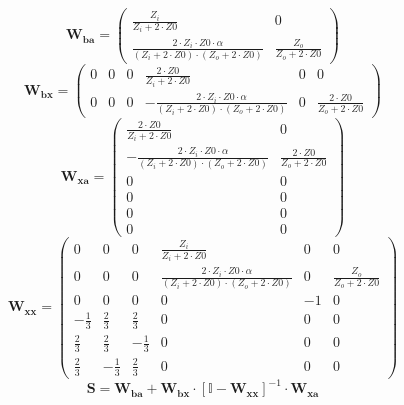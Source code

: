 \[ \mathbf{W_{ba}} = \left(\begin{smallmatrix} \frac{Z_i}{Z_i+2\cdot
Z0} & 0 \\ \frac{2\cdot Z_i\cdot Z0\cdot \alpha}{\left(Z_i+2\cdot
Z0\right)\cdot\left(Z_o+2\cdot Z0\right)} & \frac{Z_o}{Z_o+2\cdot Z0}
\end{smallmatrix}\right) \]
\[ \mathbf{W_{bx}} = \left(\begin{smallmatrix} 0 & 0 & 0 &
\frac{2\cdot Z0}{Z_i+2\cdot Z0} & 0 & 0 \\ 0 & 0 & 0 & -\frac{2\cdot
Z_i\cdot Z0\cdot \alpha}{\left(Z_i+2\cdot
Z0\right)\cdot\left(Z_o+2\cdot Z0\right)} & 0 & \frac{2\cdot
Z0}{Z_o+2\cdot Z0} \end{smallmatrix}\right) \]
\[ \mathbf{W_{xa}} = \left(\begin{smallmatrix} \frac{2\cdot
Z0}{Z_i+2\cdot Z0} & 0 \\ -\frac{2\cdot Z_i\cdot Z0\cdot
\alpha}{\left(Z_i+2\cdot Z0\right)\cdot\left(Z_o+2\cdot Z0\right)} &
\frac{2\cdot Z0}{Z_o+2\cdot Z0} \\ 0 & 0 \\ 0 & 0 \\ 0 & 0 \\ 0 & 0
\end{smallmatrix}\right) \]
\[ \mathbf{W_{xx}} = \left(\begin{smallmatrix} 0 & 0 & 0 &
\frac{Z_i}{Z_i+2\cdot Z0} & 0 & 0 \\ 0 & 0 & 0 & \frac{2\cdot Z_i\cdot
Z0\cdot \alpha}{\left(Z_i+2\cdot Z0\right)\cdot\left(Z_o+2\cdot
Z0\right)} & 0 & \frac{Z_o}{Z_o+2\cdot Z0} \\ 0 & 0 & 0 & 0 & -1 & 0
\\ -\frac{1}{3} & \frac{2}{3} & \frac{2}{3} & 0 & 0 & 0 \\ \frac{2}{3}
& \frac{2}{3} & -\frac{1}{3} & 0 & 0 & 0 \\ \frac{2}{3} & -\frac{1}{3}
& \frac{2}{3} & 0 & 0 & 0 \end{smallmatrix}\right) \]
\[ \mathbf{S}=\mathbf{W_{ba}}+\mathbf{W_{bx}}\cdot\left[ \mathbb{I}
-\mathbf{W_{xx}}\right]^{-1}\cdot\mathbf{W_{xa}} \]
